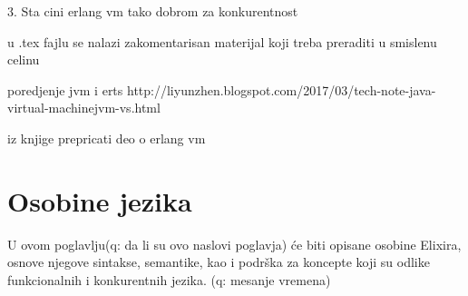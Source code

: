 \documentclass[a4paper]{article}
\begin{document}
3. Sta cini erlang vm tako dobrom za konkurentnost

u .tex fajlu se nalazi zakomentarisan materijal koji treba preraditi u smislenu celinu

poredjenje jvm i erts http://liyunzhen.blogspot.com/2017/03/tech-note-java-virtual-machinejvm-vs.html

iz knjige prepricati deo o erlang vm








\section{Osobine jezika}
\label{sec:osobine}
U ovom poglavlju(q: da li su ovo naslovi poglavja) će biti opisane osobine Elixira, osnove njegove sintakse, semantike, kao i podrška za koncepte koji su odlike funkcionalnih i konkurentnih jezika. (q: mesanje vremena) 
\end{document}
